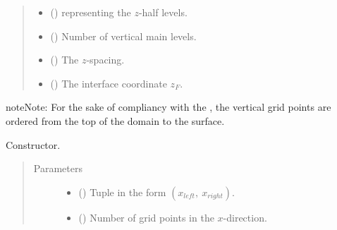 \documentclass[letterpaper,10pt,english]{sphinxmanual}
\begin{document}
\begin{fulllineitems}
\begin{quote}
\begin{description}
\begin{itemize}
\item {} 
 () \textendash{} {\hyperref[\detokenize{api:tasmania.grids.axis.Axis}]{}} representing the \(z\)-half levels.

\item {} 
 () \textendash{} Number of vertical main levels.

\item {} 
 () \textendash{} The \(z\)-spacing.

\item {} 
 () \textendash{} The interface coordinate \(z_F\).

\end{itemize}

\end{description}\end{quote}

\begin{sphinxadmonition}{note}{Note:}
For the sake of compliancy with the , the vertical grid points are
ordered from the top of the domain to the surface.
\end{sphinxadmonition}

\begin{fulllineitems}
\label{\detokenize{api:tasmania.grids.grid_xz.GridXZ.__init__}}
Constructor.
\begin{quote}\begin{description}
\item[{Parameters}] \leavevmode\begin{itemize}
\item {} 
 () \textendash{} Tuple in the form \((x_{left}, ~ x_{right})\).

\item {} 
 () \textendash{} Number of grid points in the \(x\)-direction.


\end{itemize}
\end{description}
\end{quote}
\end{fulllineitems}
\end{fulllineitems}
\end{document}
